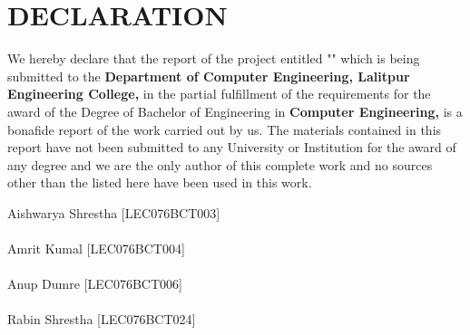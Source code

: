 \chapter*{DECLARATION}
\vspace{10pt}
We hereby declare that the report of the project entitled "\textbf{\thetitle}" which is 
being submitted to the \textbf{Department of Computer Engineering, Lalitpur Engineering College,} in the partial fulfillment of the requirements for the award 
of the Degree of Bachelor of Engineering in \textbf{Computer Engineering,} is a bonafide report of the work carried out by us. The materials 
contained in this report have not been submitted to any University or Institution for 
the award of any degree and we are the only author of this complete work and no 
sources other than the listed here have been used in this work.


\vspace{1cm}

Aishwarya Shrestha [LEC076BCT003] 
  \noindent\hrulefill\\
\\
Amrit Kumal [LEC076BCT004]   \noindent\hrulefill\\
\\
Anup Dumre [LEC076BCT006]   \noindent\hrulefill\\
\\
Rabin Shrestha [LEC076BCT024] 
  \noindent\hrulefill\\\\
\thedate